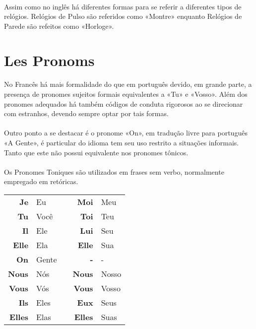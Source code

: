 \documentclass{article}
\begin{document}
            \paragraph{}Assim como no inglês há diferentes formas para se referir a diferentes tipos de relógios. Relógios de Pulso são referidos como «Montre» enquanto Relógios de Parede são refeitos como «Horloge».
\newpage

\section{Les Pronoms}
    \paragraph{}No Francês há mais formalidade do que em português devido, em grande parte, a presença de pronomes sujeitos formais equivalentes a «Tu» e «Vosso». Além dos pronomes adequados há também códigos de conduta rigorosos ao se direcionar com estranhos, devendo sempre optar por tais formas.
    
    \paragraph{}Outro ponto a se destacar é o pronome «On», em tradução livre para português «A Gente», é particular do idioma tem seu uso restrito a situações informais. Tanto que este não possui equivalente nos pronomes tônicos.
    
    \paragraph{}Os Pronomes Toniques são utilizados em frases sem verbo, normalmente empregado em retóricas.
        
    \begin{center}
        \begin{tabular}{r l c r l}
            \textbf{Je}    & Eu    &  & \textbf{Moi}   & Meu\\
            \textbf{Tu}    & Você  &  & \textbf{Toi}   & Teu\\
            \textbf{Il}    & Ele   &  & \textbf{Lui}   & Seu\\
            \textbf{Elle}  & Ela   &  & \textbf{Elle}  & Sua\\
            \textbf{On}    & Gente &  & \textbf{-}     & -\\
            \textbf{Nous}  & Nós   &  & \textbf{Nous}  & Nosso\\
            \textbf{Vous}  & Vós   &  & \textbf{Vous}  & Vosso\\
            \textbf{Ils}   & Eles  &  & \textbf{Eux}   & Seus\\
            \textbf{Elles} & Elas  &  & \textbf{Elles} & Suas
        \end{tabular}
    \end{center}
\end{document}
